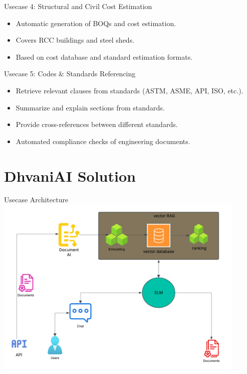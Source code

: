 \documentclass{beamer}
\begin{document}
\begin{frame}{Usecase 4: Structural and Civil Cost Estimation}
    \begin{itemize}
        \item Automatic generation of BOQs and cost estimation.
        \item Covers RCC buildings and steel sheds.
        \item Based on cost database and standard estimation formats.
    \end{itemize}
\end{frame}
\begin{frame}{Usecase 5: Codes \& Standards Referencing}
    \begin{itemize}
        \item Retrieve relevant clauses from standards (ASTM, ASME, API, ISO, etc.).
        \item Summarize and explain sections from standards.
        \item Provide cross-references between different standards.
        \item Automated compliance checks of engineering documents.
    \end{itemize}
\end{frame}

\section{DhvaniAI Solution}
\begin{frame}
    \sectionpage
\end{frame}

\begin{frame}{Usecase Architecture}
        \centering
        \includegraphics[width=0.9\textwidth]{pics/diagram.png}
\end{frame}
\end{document}
